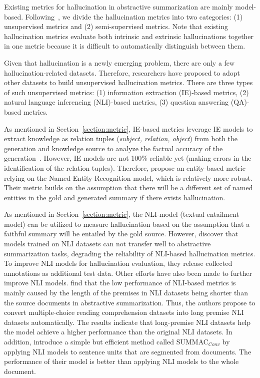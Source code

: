 Existing metrics for hallucination in abstractive summarization are mainly model-based. Following~, we divide the hallucination metrics into two categories: (1) unsupervised metrics and (2) semi-supervised metrics.
Note that existing hallucination metrics evaluate both intrinsic and extrinsic hallucinations together in one metric because it is difficult to automatically distinguish between them.

Given that hallucination is a newly emerging problem, there are only a few hallucination-related datasets. Therefore, researchers have proposed to adopt other datasets to build unsupervised hallucination metrics. There are three types of such unsupervised metrics: (1) information extraction (IE)-based metrics, (2) natural language inferencing (NLI)-based metrics, (3) question answering (QA)-based metrics.

As mentioned in Section~\ref{section:metric}, IE-based metrics leverage IE models to extract knowledge as relation tuples (\textit{subject, relation, object}) from both the generation and knowledge source to analyze the factual accuracy of the generation~. However, IE models are not 100\% reliable yet (making errors in the identification of the relation tuples). Therefore,  propose an entity-based metric relying on the Named-Entity Recognition model, which is relatively more robust. Their metric builds on the assumption that there will be a different set of named entities in the gold and generated summary if there exists hallucination.

As mentioned in Section~\ref{section:metric}, the NLI-model (textual entailment model) can be utilized to measure hallucination based on the assumption that a faithful summary will be entailed by the gold source. 
However,  discover that models trained on NLI datasets can not transfer well to abstractive summarization tasks, degrading the reliability of NLI-based hallucination metrics. To improve NLI models for hallucination evaluation, they release collected annotations as additional test data. Other efforts have also been made to further improve NLI models.   find that the low performance of NLI-based metrics is mainly caused by the length of the premises in NLI datasets being shorter than the source documents in abstractive summarization. Thus, the authors propose to convert multiple-choice reading comprehension datasets into long premise NLI datasets automatically. The results indicate that long-premise NLI datasets help the model achieve a higher performance than the original NLI datasets. In addition,  introduce a simple but efficient method called SUMMAC$_{Conv}$ by applying NLI models to sentence units that are segmented from documents. The performance of their model is better than applying NLI models to the whole document.

